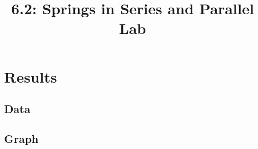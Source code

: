 \documentclass{article}
\title{6.2: Springs in Series and Parallel Lab}
\begin{document}
\section{Results}
\subsection{Data}
\subsection{Graph}
\end{document}

